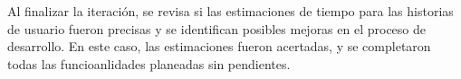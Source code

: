 \vspace{\parskip}
Al finalizar la iteración, se revisa si las estimaciones de tiempo para las historias de usuario fueron precisas y se identifican posibles mejoras en el proceso de desarrollo. En este caso, las estimaciones fueron acertadas, y se completaron todas las funcioanlidades planeadas sin pendientes.
